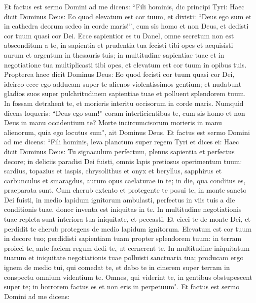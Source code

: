 \begin{biblechapter}  
\verse Et factus est sermo Domini ad me dicens: 
\verse “Fili hominis, dic principi Tyri: Haec dicit Dominus Deus: Eo quod elevatum est cor tuum, et dixisti: “Deus ego sum et in cathedra deorum sedeo in corde maris!”, cum sis homo et non Deus, et dedisti cor tuum quasi cor Dei. 
\verse Ecce sapientior es tu Danel, omne secretum non est absconditum a te, 
\verse in sapientia et prudentia tua fecisti tibi opes et acquisisti aurum et argentum in thesauris tuis; 
\verse in multitudine sapientiae tuae et in negotiatione tua multiplicasti tibi opes, et elevatum est cor tuum in opibus tuis. 
\verse Propterea haec dicit Dominus Deus: Eo quod fecisti cor tuum quasi cor Dei, 
\verse idcirco ecce ego adducam super te alienos violentissimos gentium; et nudabunt gladios suos super pulchritudinem sapientiae tuae et polluent splendorem tuum. 
\verse In fossam detrahent te, et morieris interitu occisorum in corde maris. 
\verse Numquid dicens loqueris: “Deus ego sum!” coram interficientibus te, cum sis homo et non Deus in manu occidentium te? 
\verse Morte incircumcisorum morieris in manu alienorum, quia ego locutus sum", ait Dominus Deus. 
\verse Et factus est sermo Domini ad me dicens: “Fili hominis, leva planctum super regem Tyri 
\verse et dices ei: Haec dicit Dominus Deus: Tu signaculum perfectum, plenus sapientia et perfectus decore; 
\verse in deliciis paradisi Dei fuisti, omnis lapis pretiosus operimentum tuum: sardius, topazius et iaspis, chrysolithus et onyx et beryllus, sapphirus et carbunculus et smaragdus, aurum opus caelaturae in te; in die, qua conditus es, praeparata sunt. 
\verse Cum cherub extento et protegente te posui te, in monte sancto Dei fuisti, in medio lapidum ignitorum ambulasti, 
\verse perfectus in viis tuis a die conditionis tuae, donec inventa est iniquitas in te. 
\verse In multitudine negotiationis tuae repleta sunt interiora tua iniquitate, et peccasti. Et eieci te de monte Dei, et perdidit te cherub protegens de medio lapidum ignitorum. 
\verse Elevatum est cor tuum in decore tuo; perdidisti sapientiam tuam propter splendorem tuum: in terram proieci te, ante faciem regum dedi te, ut cernerent te. 
\verse In multitudine iniquitatum tuarum et iniquitate negotiationis tuae polluisti sanctuaria tua; producam ergo ignem de medio tui, qui comedat te, et dabo te in cinerem super terram in conspectu omnium videntium te. 
\verse Omnes, qui viderint te, in gentibus obstupescent super te; in horrorem factus es et non eris in perpetuum". 
\verse Et factus est sermo Domini ad me dicens: 

\end{biblechapter}
